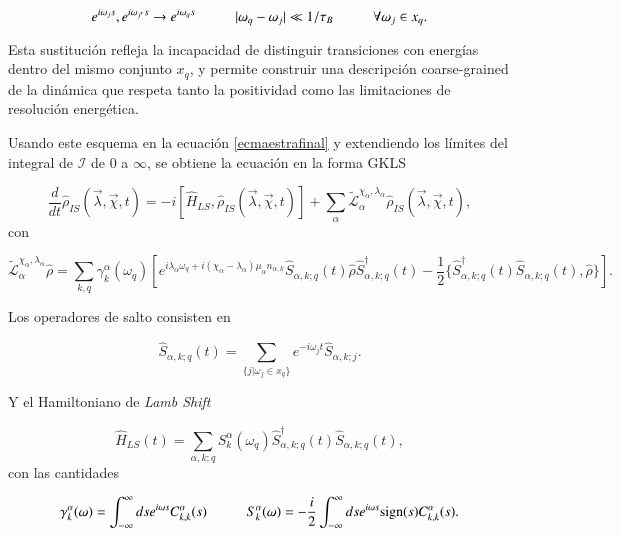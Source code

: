\begin{equation*}
    e^{i\omega_{j}s},e^{i\omega_{j'}s} \to e^{i\omega_{q}s} \hspace{10mm} |\omega_{q} - \omega_{j}| \ll 1/\tau_{B} \hspace{10mm} \forall \omega_{j} \in x_{q}.
\end{equation*}

Esta sustitución refleja la incapacidad de distinguir transiciones con energías dentro del mismo conjunto \( x_q \), y permite construir una descripción coarse-grained de la dinámica que respeta tanto la positividad como las limitaciones de resolución energética\cite{chruscinski2017brief}. 

Usando este esquema en la ecuación \ref{ecmaestrafinal} y extendiendo los límites del integral de $\mathcal{I}$ de 0 a $\infty$, se obtiene la ecuación en la forma GKLS

\begin{equation*}
    \frac{d}{dt}\hat{\rho}_{IS}(\vec{\lambda},\vec{\chi},t) = -i[\hat{H}_{LS},\hat{\rho}_{IS}(\vec{\lambda},\vec{\chi},t)] + \sum_{\alpha}\tilde{\mathcal{L}}^{\chi_{\alpha},\lambda_{\alpha}}_{\alpha} \hat{\rho}_{IS}(\vec{\lambda},\vec{\chi},t),
\end{equation*}
con

\begin{equation*}
    \tilde{\mathcal{L}}^{\chi_{\alpha},\lambda_{\alpha}}_{\alpha}\hat{\rho} = \sum_{k,q}\gamma^{\alpha}_{k}(\omega_{q}) \left[e^{i\lambda_{\alpha}\omega_{q} + i(\chi_{\alpha}-\lambda_{\alpha})\mu_{\alpha}n_{\alpha,k}}\hat{S}_{\alpha,k;q}(t)\hat{\rho}\hat{S}^{\dagger}_{\alpha,k;q}(t) - \frac{1}{2}\{\hat{S}^{\dagger}_{\alpha,k;q}(t)\hat{S}_{\alpha,k;q}(t),\hat{\rho} \} \right].
\end{equation*}

Los operadores de salto consisten en

\begin{equation*}
    \hat{S}_{\alpha,k;q}(t) = \sum_{\{j|\omega_{j}\in x_{q} \} } e^{-i\omega_{j}t}\hat{S}_{\alpha,k;j}.
\end{equation*}

Y el Hamiltoniano de \textit{Lamb Shift}

\begin{equation*}
    \hat{H}_{LS}(t) = \sum_{\alpha,k;q} S^{\alpha}_{k}(\omega_{q}) \hat{S}^{\dagger}_{\alpha,k;q}(t)\hat{S}_{\alpha,k;q}(t),
\end{equation*}
con las cantidades

\begin{equation}
    \gamma_{k}^{\alpha}(\omega) = \int_{-\infty}^{\infty}ds e^{i\omega s}C^{\alpha}_{k,k}(s) \hspace{10mm} S^{\alpha}_{k}(\omega) = - \frac{i}{2} \int^{\infty}_{-\infty}ds e^{i\omega s} \text{sign}(s)C^{\alpha}_{k,k}(s).
    \label{sec2:gammaanddelta}
\end{equation}

